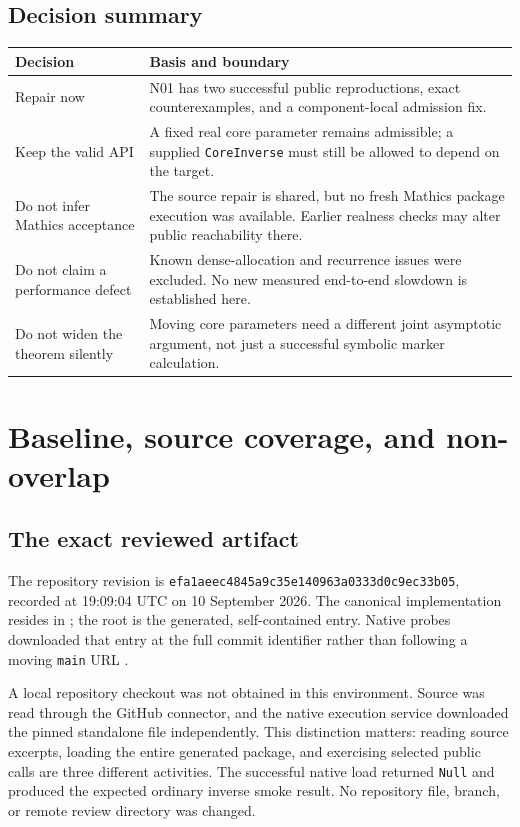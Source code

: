 \documentclass[11pt,letterpaper]{article}
\theoremstyle{remark}\newtheorem{remark}[theorem]{Remark}
\newcommand{\code}[1]{\texttt{#1}}
\newcommand{\file}[1]{\path{#1}}
\newcommand{\fullrev}{\texttt{efa1aeec4845a9c35e140963a0333d0c9ec33b05}}
\begin{document}
\subsection{Decision summary}
\begin{center}
\begin{tabularx}{\textwidth}{@{}p{}Y@{}}
\toprule
Decision & Basis and boundary\\
\midrule
Repair now & N01 has two successful public reproductions, exact counterexamples,
and a component-local admission fix.\\
Keep the valid API & A fixed real core parameter remains admissible; a supplied
\code{CoreInverse} must still be allowed to depend on the target.\\
Do not infer Mathics acceptance & The source repair is shared, but no fresh
Mathics package execution was available. Earlier realness checks may alter
public reachability there.\\
Do not claim a performance defect & Known dense-allocation and recurrence
issues were excluded. No new measured end-to-end slowdown is established here.\\
Do not widen the theorem silently & Moving core parameters need a different
joint asymptotic argument, not just a successful symbolic marker calculation.\\
\bottomrule
\end{tabularx}
\end{center}

\section{Baseline, source coverage, and non-overlap}
\subsection{The exact reviewed artifact}
The repository revision is \fullrev, recorded at 19:09:04 UTC on
10 September 2026. The canonical implementation resides in
\file{src/Kernel/}; the root \file{AsymptoticAnalysis.wl} is the generated,
self-contained entry. Native probes downloaded that entry at the full commit
identifier rather than following a moving \code{main} URL
\cite{repo,sourcemap,guide}.

A local repository checkout was not obtained in this environment. Source was
read through the GitHub connector, and the native execution service downloaded
the pinned standalone file independently. This distinction matters:
reading source excerpts, loading the entire generated package, and exercising
selected public calls are three different activities. The successful native
load returned \code{Null} and produced the expected ordinary inverse smoke
result. No repository file, branch, or remote review directory was changed.
\end{document}
